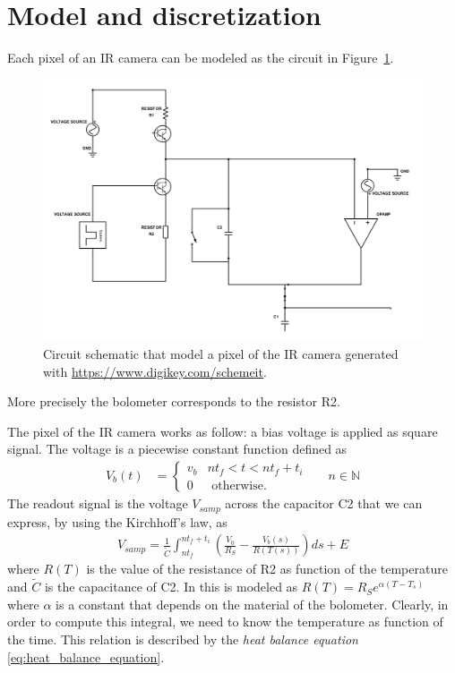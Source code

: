 \section{Model and discretization} \label{sec:model_disc}

Each pixel of an IR camera can be modeled as the circuit in Figure~\ref{fig:circuit}.
\begin{figure}[ht]
 \includegraphics[scale=0.31]{gfx/circuit.png}
\caption{Circuit schematic that model a pixel of the IR camera generated with \url{https://www.digikey.com/schemeit}.}
\label{fig:circuit}
\end{figure}
More precisely the bolometer corresponds to the resistor R2. 

The pixel of the IR camera works as follow: a bias voltage is applied as square signal. The voltage is a piecewise constant function defined as 
\begin{align} \label{eq:Vb}
 V_b(t)&=\begin{cases} v_b & n t_f < t < n t_f + t_i \\
 0 &\mbox{ otherwise.} 
 \end{cases} && n \in {\mathbb N}
\end{align}
The readout signal is the voltage $V_{samp}$ across the capacitor C2 that we can express, by using the Kirchhoff's law, as
\begin{align} \label{eq:Vsamp_def}
 V_{samp} = 
 \frac{1}{\tilde C} \int_{n t_f}^{n t_f + t_i} \left( \frac{V_0}{R_S} - \frac{V_b(s)}{R(T(s))} \right) ds + E
\end{align}
where $R(T)$ is the value of the resistance of R2 as function of the temperature and $\tilde C$ is the capacitance of C2. In \cite{xiu2010research} this is modeled as $R(T)=R_S e^{\alpha(T-T_s)}$ where $\alpha$ is a constant that depends on the material of the bolometer. Clearly, in order to compute this integral, we need to know the temperature as function of the time. This relation is described  by the  \emph{heat balance equation} \eqref{eq:heat_balance_equation}.

